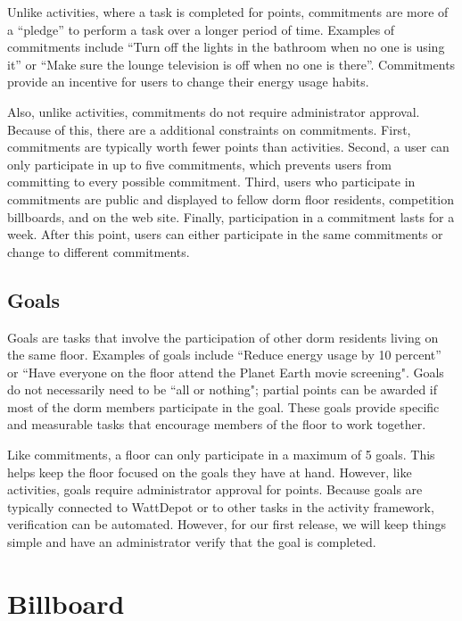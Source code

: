 Unlike activities, where a task is completed for points, commitments are more of a ``pledge'' to perform a task over a longer period of time.  Examples of commitments include ``Turn off the lights in the bathroom when no one is using it'' or ``Make sure the lounge television is off when no one is there''.  Commitments provide an incentive for users to change their energy usage habits.

Also, unlike activities, commitments do not require administrator approval.  Because of this, there are a additional constraints on commitments.  First, commitments are typically worth fewer points than activities.  Second, a user can only participate in up to five commitments, which prevents users from committing to every possible commitment.  Third, users who participate in commitments are public and displayed to fellow dorm floor residents, competition billboards, and on the web site.  Finally, participation in a commitment lasts for a week.  After this point, users can either participate in the same commitments or change to different commitments.

\subsection{Goals}

Goals are tasks that involve the participation of other dorm residents living on the same floor.  Examples of goals include ``Reduce energy usage by 10 percent'' or ``Have everyone on the floor attend the Planet Earth movie screening".  Goals do not necessarily need to be ``all or nothing"; partial points can be awarded if most of the dorm members participate in the goal.  These goals provide specific and measurable tasks that encourage members of the floor to work together.

Like commitments, a floor can only participate in a maximum of 5 goals.  This helps keep the floor focused on the goals they have at hand.  However, like activities, goals require administrator approval for points.  Because goals are typically connected to WattDepot or to other tasks in the activity framework, verification can be automated.  However, for our first release, we will keep things simple and have an administrator verify that the goal is completed.

\section{Billboard}
\label{billboard}


